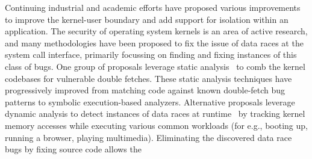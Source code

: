 Continuing industrial and academic efforts have proposed various 
improvements to improve the kernel-user boundary and add support for 
isolation within an application.
The security of operating system kernels is an area of active research, and 
many
methodologies have been proposed to fix the issue of data races at the system
call interface, primarily focussing on finding and fixing instances of this 
class of bugs.
One group of proposals leverage 
static analysis~\cite{dftinker, wang2017double, wang2019dftracker, deadline}
to comb the 
kernel codebases for vulnerable double fetches.
These static analysis techniques have progressively improved
from matching code against known double-fetch bug patterns to
symbolic execution-based analyzers.
Alternative proposals
leverage dynamic analysis to detect instances of data races at 
runtime~\cite{jurczyk2013bochspwn, schwartzDECAF, wilhelm2016xenpwn}
by tracking kernel memory accesses while executing various common 
workloads (for e.g., booting up, running a browser, playing multimedia).
Eliminating the discovered data race bugs by fixing source code allows the
